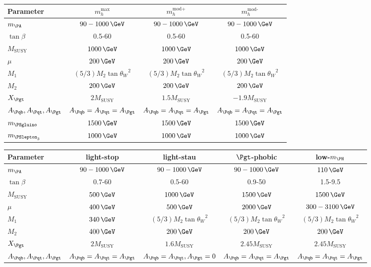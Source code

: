 \begin{table}[tbh]
\begin{tabular}{|l|c|c|c|}
\hline
Parameter & $m_{h}^{\text{max}}$ & $m_{h}^{\text{mod+}}$ & $m_{h}^{\text{mod-}}$ \\
\hline
$m_{\PA}$ & $90-1000\,\GeV$ & $90-1000\,\GeV$ & $90-1000\,\GeV$\\
$\tan\beta$ & 0.5-60 & 0.5-60 & 0.5-60 \\
$M_{\text{SUSY}}$ & $1000\,\GeV$ & $1000\,\GeV$ & $1000\,\GeV$\\
$\mu$ & $200\,\GeV$ & $200\,\GeV$ & $200\,\GeV$\\
$M_{1}$ & $(5/3)M_{2}\tan{\theta_{W}}^{2}$ & $(5/3)M_{2}\tan{\theta_{W}}^{2}$ & $(5/3)M_{2}\tan{\theta_{W}}^{2}$\\
$M_{2}$ & $200\,\GeV$ & $200\,\GeV$ & $200\,\GeV$ \\
$X_{\Pgt}$ & $2M_{\text{SUSY}}$ & $1.5M_{\text{SUSY}}$ & $-1.9M_{\text{SUSY}}$ \\
$A_{\Pqb},A_{\Pqt},A_{\Pgt}$ & $A_{\Pqb} = A_{\Pqt} = A_{\Pgt}$ & $A_{\Pqb} = A_{\Pqt} = A_{\Pgt}$ & $A_{\Pqb} = A_{\Pqt} = A_{\Pgt}$\\
$m_{\PSgluino}$ & $1500\,\GeV$ & $1500\,\GeV$ & $1500\,\GeV$\\
$m_{\PSlepton_{3}}$ & $1000\,\GeV$ & $1000\,\GeV$ & $1000\,\GeV$\\
\hline
\end{tabular}
\begin{tabular}{|l|c|c|c|c|}
\hline
Parameter & light-stop & light-stau & $\Pgt$-phobic & low-$m_{\PH}$ \\
\hline
$m_{\PA}$ & $90-1000\,\GeV$ & $90-1000\,\GeV$ & $90-1000\,\GeV$ & $110\,\GeV$\\
$\tan\beta$ & 0.7-60 & 0.5-60 & 0.9-50 & 1.5-9.5\\
$M_{\text{SUSY}}$ & $500\,\GeV$ & $1000\,\GeV$ & $1500\,\GeV$ & $1500\,\GeV$\\
$\mu$ & $400\,\GeV$ & $500\,\GeV$ & $2000\,\GeV$ & $300-3100\,\GeV$\\
$M_{1}$ & $340\,\GeV$ & $(5/3)M_{2}\tan{\theta_{W}}^{2}$ & $(5/3)M_{2}\tan{\theta_{W}}^{2}$  & $(5/3)M_{2}\tan{\theta_{W}}^{2}$ \\
$M_{2}$ & $400\,\GeV$ & $200\,\GeV$ & $200\,\GeV$ & $200\,\GeV$\\
$X_{\Pgt}$ & $2M_{\text{SUSY}}$ & $1.6M_{\text{SUSY}}$ & $2.45M_{\text{SUSY}}$ & $2.45M_{\text{SUSY}}$ \\
$A_{\Pqb},A_{\Pqt},A_{\Pgt}$ & $A_{\Pqb} = A_{\Pqt} = A_{\Pgt}$ & $A_{\Pqb} = A_{\Pqt}, A_{\Pgt} = 0$ & $A_{\Pqb} = A_{\Pqt} = A_{\Pgt}$ & $A_{\Pqb} = A_{\Pqt} = A_{\Pgt}$ \\

\end{tabular}
\end{table}
